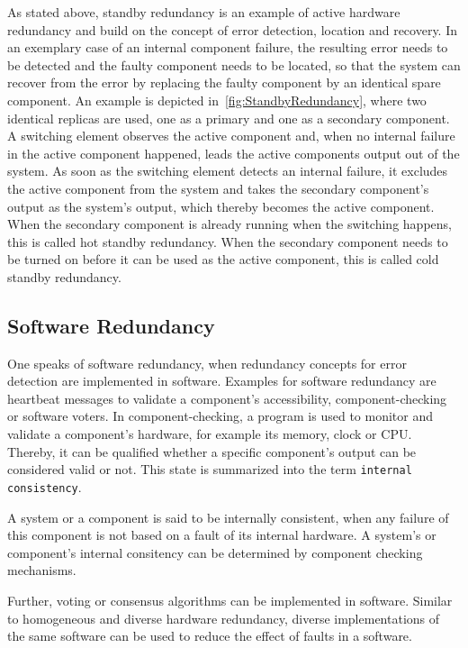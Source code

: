 As stated above, standby redundancy is an example of active hardware redundancy and build on the concept of error detection, location and recovery.
In an exemplary case of an internal component failure, the resulting error needs to be detected and the faulty component needs to be located, so that the system can recover from the error by replacing the faulty component by an identical spare component.
An example is depicted in~\autoref{fig:StandbyRedundancy}, where two identical replicas are used, one as a primary and one as a secondary component.
A switching element observes the active component and, when no internal failure in the active component happened, leads the active components output out of the system.
As soon as the switching element detects an internal failure, it excludes the active component from the system and takes the secondary component's output as the system's output, which thereby becomes the active component.
When the secondary component is already running when the switching happens, this is called hot standby redundancy.
When the secondary component needs to be turned on before it can be used as the active component, this is called cold standby redundancy.

\subsection{Software Redundancy}
One speaks of software redundancy, when redundancy concepts for error detection are implemented in software.
Examples for software redundancy are heartbeat messages to validate a component's accessibility, component-checking or software voters.
In component-checking, a program is used to monitor and validate a component's hardware, for example its memory, clock or \gls*{CPU}.
Thereby, it can be qualified whether a specific component's output can be considered valid or not.
This state is summarized into the term \texttt{internal consistency}.

\begin{definition}
A system or a component is said to be internally consistent, when any failure of this component is not based on a fault of its internal hardware.
A system's or component's internal consitency can be determined by component checking mechanisms.
\end{definition}

Further, voting or consensus algorithms can be implemented in software.
Similar to homogeneous and diverse hardware redundancy, diverse implementations of the same software can be used to reduce the effect of faults in a software.

